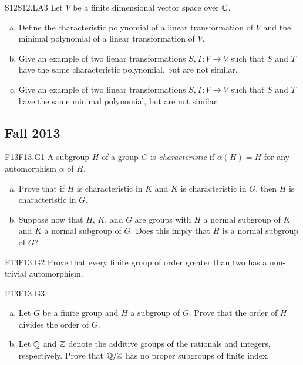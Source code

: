\documentclass[../AlgebraQualSolutions.tex]{subfiles}
\begin{document}
	\begin{prob}{S12}{S12.LA3}
		Let $V$ be a finite dimensional vector space over $\mathbb{C}$.

		\begin{enumerate}[(a)]
			\item Define the characteristic polynomial of a linear transformation of $V$ and the minimal polynomial of a linear transformation of $V$.
			\item Give an example of two lienar transformations $S,T: V \to V$ such that $S$ and $T$ have the same characteristic polynomial, but are not similar.
			\item Give an example of two linear transformations $S,T: V \to V$ such that $S$ and $T$ have the same minimal polynomial, but are not similar.
		\end{enumerate}
	\end{prob}

	\subsection{Fall 2013}

	\begin{prob}{F13}{F13.G1}
		A subgroup $H$ of a group $G$ is \emph{characteristic} if $\alpha(H) = H$ for any automorphism $\alpha$ of $H$.
		
		\begin{enumerate}[(a)]
			\item Prove that if $H$ is characteristic in $K$ and $K$ is characteristic in $G$, then $H$ is characteristic in $G$.
			\item Suppose now that $H$, $K$, and $G$ are groups with $H$ a normal subgroup of $K$ and $K$ a normal subgroup of $G$. Does this imply that $H$ is a normal subgroup of $G$?
		\end{enumerate}
	\end{prob}

	\begin{prob}{F13}{F13.G2}
		Prove that every finite group of order greater than two has a non-trivial automorphism.
	\end{prob}

	\begin{prob}{F13}{F13.G3}

		\begin{enumerate}[(a)]
			\item Let $G$ be a finite group and $H$ a subgroup of $G$. Prove that the order of $H$ divides the order of $G$.
			\item  Let $\mathbb{Q}$ and $\mathbb{Z}$ denote the additive groups of the rationals and integers, respectively. Prove that $\mathbb{Q}/\mathbb{Z}$ has no proper subgroups of finite index.
		\end{enumerate}
	\end{prob}
\end{document}

